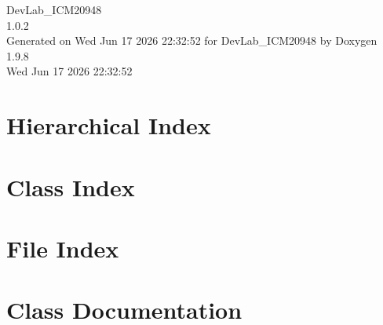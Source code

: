 \documentclass[twoside]{book}
\newcommand{\+}{\discretionary{\mbox{\scriptsize$\hookleftarrow$}}{}{}}
\newcommand{\clearemptydoublepage}{%
    \newpage{\pagestyle{empty}\cleardoublepage}%
  }
\begin{document}
  \raggedbottom
    \hypersetup{pageanchor=false,
                bookmarksnumbered=true,
                pdfencoding=unicode
               }
  \begin{titlepage}
  \vspace*{7cm}
  \begin{center}%
  {\Large Dev\+Lab\+\_\+\+ICM20948}\\
  [1ex]\large 1.\+0.\+2 \\
  \vspace*{1cm}
  {\large Generated on Wed Jun 17 2026 22\+:32\+:52 for Dev\+Lab\+\_\+\+ICM20948 by Doxygen 1.9.8}\\
    \vspace*{0.5cm}
    {\small Wed Jun 17 2026 22:32:52}
  \end{center}
  \end{titlepage}
  \clearemptydoublepage
  \tableofcontents
  \clearemptydoublepage
  \hypersetup{pageanchor=true}

\chapter{Hierarchical Index}

\chapter{Class Index}

\chapter{File Index}

\chapter{Class Documentation}










\end{document}
